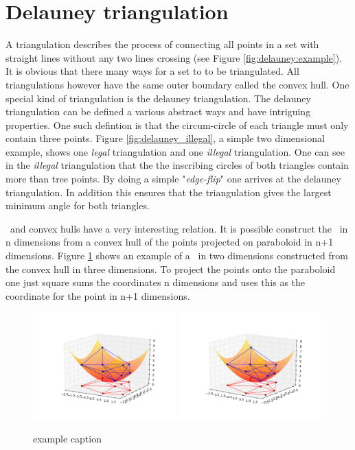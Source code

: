 \section{Delauney triangulation}
\label{sec:delauney_tri}
A triangulation describes the process of connecting all points in a set with straight lines without any two lines crossing (see Figure \ref{fig:delauney:example}). It is obvious that there many ways for a set to to be triangulated. All triangulations however have the same outer boundary called the convex hull. One special kind of triangulation is the delauney triangulation. The delauney triangulation can be defined a various abstract ways and have intriguing properties. 
One such defintion is that the circum-circle of each triangle must only contain three points. Figure \ref{fig:delauney_illegal}, a simple two dimensional example, shows one \textit{legal} triangulation and one \textit{illegal} triangulation. One can see in the \textit{illegal} triangulation that the the inscribing circles of both triangles contain more than tree points. By doing a simple "\textit{edge-flip}" one arrives at the delauney triangulation. In addition this ensures that the triangulation gives the largest minimum angle for both triangles. 

\deltri\ and convex hulls have a very interesting relation. It is possible construct the \deltri\ in n dimensions from a convex hull of the points projected on paraboloid in n+1 dimensions.
Figure \ref{fig:delauney_projection} shows an example of a \deltri\ in two dimensions constructed from the convex hull in three dimensions. To project the points onto the paraboloid one just square sums the coordinates n dimensions and uses this as the coordinate for the point in n+1 dimensions. 

\begin{figure}[htbp] %
   \centering
   \includegraphics[width=0.49\textwidth]{chapter7/plots/delauney_project_left.pdf} 
   \hspace{-1.5cm}
   \includegraphics[width=0.49\textwidth]{chapter7/plots/delauney_project_right.pdf} 
   \caption{example caption}
   \label{fig:delauney_projection}
\end{figure}

